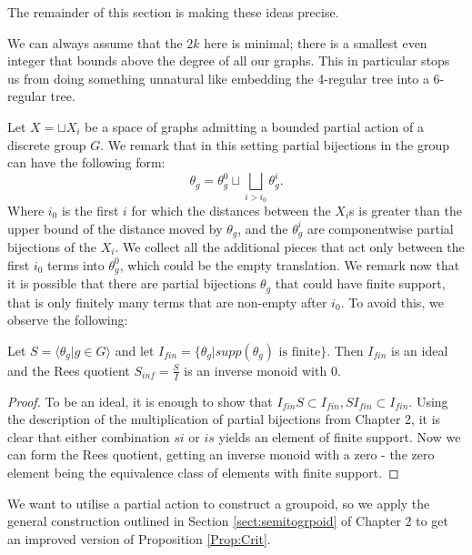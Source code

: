 \begin{conjecture}
The remainder of this section is making these ideas precise.
\begin{remark}
We can always assume that the $2k$ here is minimal; there is a smallest even integer that bounds above the degree of all our graphs. This in particular stops us from doing something unnatural like embedding the 4-regular tree into a 6-regular tree.
\end{remark}

Let $X= \sqcup X_{i}$ be a space of graphs admitting a bounded partial action of a discrete group $G$. We remark that in this setting partial bijections in the group can have the following form: 
\begin{equation*}
\theta_{g}=\theta_{g}^{0} \sqcup \bigsqcup_{i>i_{0}}\theta_{g}^{i}.
\end{equation*} 
Where $i_{0}$ is the first $i$ for which the distances between the $X_{i}$s is greater than the upper bound of the distance moved by $\theta_{g}$, and the $\theta_{g}^{i}$ are componentwise partial bijections of the $X_{i}$. We collect all the additional pieces that act only between the first $i_{0}$ terms into $\theta_{g}^{0}$, which could be the empty translation. We remark now that it is possible that there are partial bijections $\theta_{g}$ that could have finite support, that is only finitely many terms that are non-empty after $i_{0}$. To avoid this, we observe the following:

\begin{proposition}
Let $S = \langle \theta_{g} | g \in G \rangle$ and let $I_{fin}= \lbrace \theta_{g} | supp(\theta_{g}) \mbox{ is finite} \rbrace$. Then $I_{fin}$ is an ideal and the Rees quotient $S_{inf}=\frac{S}{I}$ is an inverse monoid with $0$.
\end{proposition}
\begin{proof}
To be an ideal, it is enough to show that $I_{fin}S \subset I_{fin}, SI_{fin}\subset I_{fin}$. Using the description of the multiplication of partial bijections from Chapter 2, it is clear that either combination $si$ or $is$ yields an element of finite support. Now we can form the Rees quotient, getting an inverse monoid with a zero - the zero element being the equivalence class of elements with finite support.
\end{proof}

We want to utilise a partial action to construct a groupoid, so we apply the general construction outlined in Section \ref{sect:semitogrpoid} of Chapter 2 to get an improved version of Proposition \ref{Prop:Crit}.


\end{conjecture}
